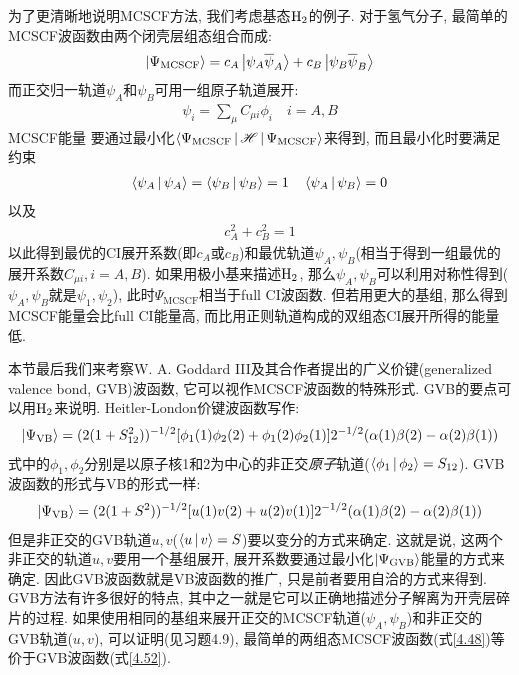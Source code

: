 为了更清晰地说明MCSCF方法, 
我们考虑基态$\mathrm{H}_2$的例子. 
对于氢气分子, 
最简单的MCSCF波函数由两个闭壳层组态组合而成:
\begin{align}\label{4.48}
\Ket{\Psi_\mathrm{MCSCF}} = c_A\Ket{\psi_A\overline{\psi}_A} + c_B\Ket{\psi_B\overline{\psi}_B} 
\end{align}
而正交归一轨道$\psi_A$和$\psi_B$可用一组原子轨道展开:
\begin{align}
\psi_i=\sum_\mu C_{\mu i}\phi_i\quad i=A,B
\end{align}
MCSCF能量 要通过最小化$\Braket{\Psi_\mathrm{MCSCF}|\mathscr{H}|\Psi_\mathrm{MCSCF}}$来得到, 而且最小化时要满足约束
\begin{align}
\Braket{\psi_A|\psi_A} = \Braket{\psi_B|\psi_B}=1\quad \Braket{\psi_A|\psi_B}=0
\end{align}
以及
\begin{align}
c_A^2 + c_B^2 = 1
\end{align}
以此得到最优的CI展开系数(即$c_A$或$c_B$)和最优轨道$\psi_A,\psi_B$(相当于得到一组最优的展开系数$C_{\mu i}, i=A,B$). 
如果用极小基来描述$\mathrm{H}_2$, 
那么$\psi_A,\psi_B$可以利用对称性得到($\psi_A,\psi_B$就是$\psi_1,\psi_2$), 
此时$\Psi_\mathrm{MCSCF}$相当于full CI波函数. 
但若用更大的基组, 
那么得到MCSCF能量会比full CI能量高, 
而比用\hft 正则轨道构成的双组态CI展开所得的能量低.


本节最后我们来考察W. A. Goddard III及其合作者提出的广义价键(generalized valence bond, 
GVB)波函数, 
它可以视作MCSCF波函数的特殊形式. 
GVB的要点可以用$\mathrm{H}_2$来说明. 
Heitler-London价键波函数写作:
\begin{align}
\Ket{\Psi_\mathrm{VB}} = (2(1+S_{12}^2))^{-1/2} [\phi_1(1)\phi_2(2) + \phi_1(2)\phi_2(1)]2^{-1/2}(\alpha(1)\beta(2)-\alpha(2)\beta(1))
\end{align}
式中的$\phi_1,\phi_2$分别是以原子核1和2为中心的非正交\emph{原子}轨道($\Braket{\phi_1|\phi_2}=S_{12}$). 
GVB波函数的形式与VB的形式一样:
\begin{align}\label{4.52}
	\Ket{\Psi_\mathrm{VB}} = (2(1+S^2))^{-1/2} [u(1)v(2) + u(2)v(1)]2^{-1/2}(\alpha(1)\beta(2)-\alpha(2)\beta(1))
\end{align}
但是非正交的GVB轨道$u,v$($\Braket{u|v}=S$)要以变分的方式来确定. 
这就是说, 
这两个非正交的轨道$u,v$要用一个基组展开, 
展开系数要通过最小化$\Ket{\Psi_\mathrm{GVB}}$能量的方式来确定. 
因此GVB波函数就是VB波函数的推广, 
只是前者要用自洽的方式来得到. 
GVB方法有许多很好的特点, 
其中之一就是它可以正确地描述分子解离为开壳层碎片的过程. 
如果使用相同的基组来展开正交的MCSCF轨道($\psi_A,\psi_B$)和非正交的GVB轨道($u,v$), 
可以证明(见习题4.9), 
最简单的两组态MCSCF波函数(式\eqref{4.48})等价于GVB波函数(式\eqref{4.52}).



